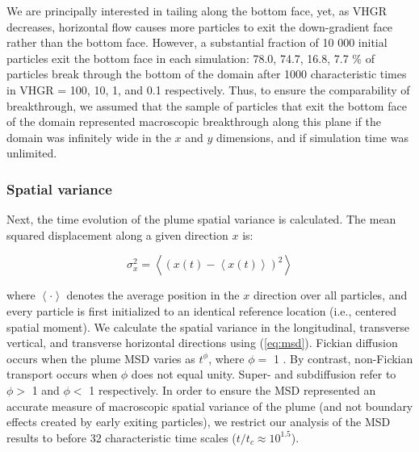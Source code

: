 We are principally interested in tailing along the bottom face, yet, as VHGR decreases, horizontal flow causes more particles to exit the down-gradient face rather than the bottom face. However, a substantial fraction of 10 000 initial particles exit the bottom face in each simulation: 78.0, 74.7, 16.8, 7.7 \% of particles break through the bottom of the domain after 1000 characteristic times in VHGR = 100, 10, 1, and 0.1 respectively. Thus, to ensure the comparability of breakthrough, we assumed that the sample of particles that exit the bottom face of the domain represented macroscopic breakthrough along this plane if the domain was infinitely wide in the $x$ and $y$ dimensions, and if simulation time was unlimited. 


%
%
\subsubsection{Spatial variance}
\label{ss_msd}

Next, the time evolution of the plume spatial variance is calculated. The mean squared displacement along a given direction $x$ is:  

\begin{equation}
\label{eq:msd}
    \sigma_{x}^2 = \left\langle (x(t) -  \left\langle x(t) \right\rangle)^2 \right\rangle
\end{equation}

where $\left\langle \cdot \right\rangle$ denotes the average position in the $x$ direction over all particles, and every particle is first initialized to an identical reference location (i.e., centered spatial moment). We calculate the spatial variance in the longitudinal, transverse vertical, and transverse horizontal directions using (\ref{eq:msd}). Fickian diffusion occurs when the plume MSD varies as $t^{\phi}$, where $\phi = $ 1 \citep{berkowitz1991dispersion, neuman1990universal}. By contrast, non-Fickian transport occurs when $\phi$ does not equal unity. Super- and subdiffusion refer to $\phi > $ 1 and $\phi < $ 1 respectively. In order to ensure the MSD represented an accurate measure of macroscopic spatial variance of the plume (and not boundary effects created by early exiting particles), we restrict our analysis of the MSD results to before 32 characteristic time scales ($t/t_c \approx 10^{1.5}$). %


